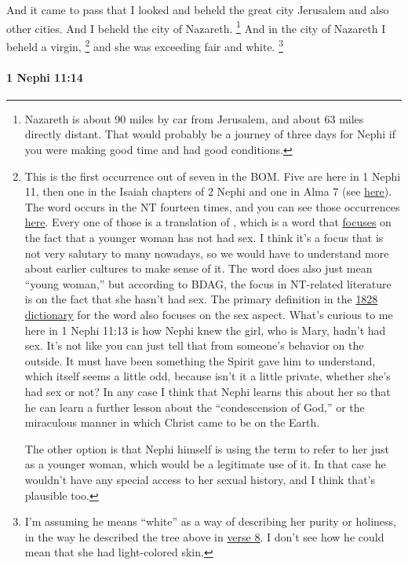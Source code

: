 			And it came to pass that I looked
			and beheld the great city Jerusalem and also other cities.
			And I beheld the city of Nazareth.%
				\footnote{%
					\label{1NEPHI-11-13-NOTE-nazareth}%
					Nazareth is about 90 miles by car from Jerusalem, and about 63 miles directly distant. That would probably be a journey of three days for Nephi if you were making good time and had good conditions.
					}
			And in the city of Nazareth I beheld a virgin,%
				\footnote{%
					\label{1NEPHI-11-13-NOTE-virgin}%
					This is the first occurrence out of seven in the BOM. Five are here in 1 Nephi 11, then one in the Isaiah chapters of 2 Nephi and one in Alma 7 (see \hyperref[VIRGIN-BOM]{here}). The word occurs in the NT fourteen times, and you can see those occurrences \hyperref[VIRGIN-NT-KJV]{here}. Every one of those is a translation of , which is a word that \hyperref[PARTHENOS]{focuses} on the fact that a younger woman has not had sex. I think it's a focus that is not very salutary to many nowadays, so we would have to understand more about earlier cultures to make sense of it. The word does also just mean ``young woman,'' but according to BDAG, the focus in NT-related literature is on the fact that she hasn't had sex. The primary definition in the \hyperref[VIRGIN-1828]{1828 dictionary} for the word also focuses on the sex aspect. What's curious to me here in 1 Nephi 11:13 is how Nephi knew the girl, who is Mary, hadn't had sex. It's not like you can just tell that from someone's behavior on the outside. It must have been something the Spirit gave him to understand, which itself seems a little odd, because isn't it a little private, whether she's had sex or not? In any case I think that Nephi learns this about her so that he can learn a further lesson about the ``condescension of God,'' or the miraculous manner in which Christ came to be on the Earth.
					
					The other option is that Nephi himself is using the term to refer to her just as a younger woman, which would be a legitimate use of it. In that case he wouldn't have any special access to her sexual history, and I think that's plausible too.
					}
			and she was exceeding fair and white.%
				\footnote{%
					\label{1NEPHI-11-13-NOTE-white}%
					I'm assuming he means ``white'' as a way of describing her purity or holiness, in the way he described the tree above in \hyperref[1NEPHI-11-8]{verse 8}. I don't see how he could mean that she had light-colored skin.
					}

		\paragraph{1 Nephi 11:14} %
			\label{1NEPHI-11-14}

